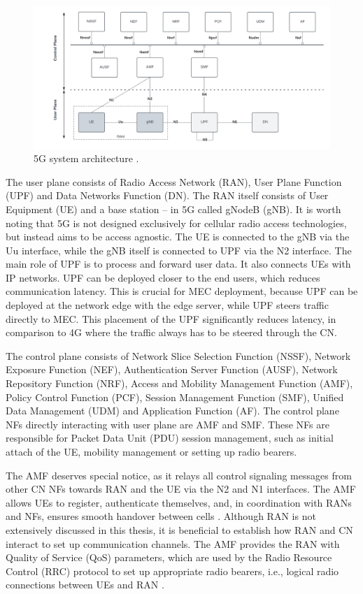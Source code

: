 \documentclass[12pt,a4paper,twoside]{report}
\begin{document}
\begin{figure}[ht]
	\centering
	\includegraphics[width=\textwidth]{./images/5G-CN.png}
	\caption{5G system architecture \cite{ETSI:TS:5G}.}
	\label{F:5G-arch}
\end{figure}

The user plane consists of Radio Access Network (RAN), User Plane Function (UPF) and Data Networks Function (DN). The RAN itself consists of User Equipment (UE) and a base station – in 5G called gNodeB (gNB). It is worth noting that 5G is not designed exclusively for cellular radio access technologies, but instead aims to be access agnostic. The UE is connected to the gNB via the Uu interface, while the gNB itself is connected to UPF via the N2 interface. The main role of UPF is to process and forward user data. It also connects UEs with IP networks. UPF can be deployed closer to the end users, which reduces communication latency. This is crucial for MEC deployment, because UPF can be deployed at the network edge with the edge server, while UPF steers traffic directly to MEC. This placement of the UPF significantly reduces latency, in comparison to 4G where the traffic always has to be steered through the CN. \cite{rommer20195g}

The control plane consists of Network Slice Selection Function (NSSF), Network Exposure Function (NEF), Authentication Server Function (AUSF), Network Repository Function (NRF), Access and Mobility Management Function (AMF), Policy Control Function (PCF), Session Management Function (SMF), Unified Data Management (UDM) and Application Function (AF). The control plane NFs directly interacting with user plane are AMF and SMF. These NFs are responsible for Packet Data Unit (PDU) session management, such as initial attach of the UE, mobility management or setting up radio bearers. \cite{rommer20195g}
  
The AMF deserves special notice, as it relays all control signaling messages from other CN NFs towards RAN and the UE via the N2 and N1 interfaces. The AMF allows UEs to register, authenticate themselves, and, in coordination with RANs and NFs, ensures smooth handover between cells \cite{rommer20195g}. Although RAN is not extensively discussed in this thesis, it is beneficial to establish how RAN and CN interact to set up communication channels. The AMF provides the RAN with Quality of Service (QoS) parameters, which are used by the Radio Resource Control (RRC) protocol to set up appropriate radio bearers, i.e., logical radio connections between UEs and RAN \cite{dahlman-2020-5g}.
  
\end{document}
